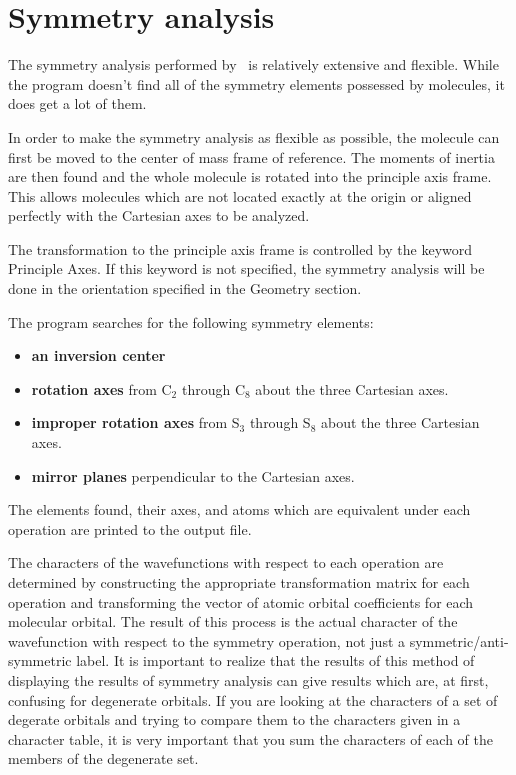 \chapter{Symmetry analysis}

The symmetry analysis performed by \calcprog\ is relatively extensive
and flexible.  While the program doesn't find all
of the symmetry elements possessed by molecules, it does get a lot of
them. 

In order to make the symmetry analysis as flexible as possible, the
molecule can first be moved to the center of mass frame of reference. 
The 
moments of inertia are then found and the whole molecule is rotated
into the principle axis frame.  This allows molecules which are not
located exactly at the origin or aligned perfectly with the Cartesian
axes to be analyzed.  

The transformation to the principle axis frame is controlled by the
keyword {\sf Principle Axes}.  If this keyword is not specified, the
symmetry analysis will be done in the orientation specified in the
{\sf Geometry} section.

The program searches for the following
symmetry elements:

\begin{itemize}

\item {\bf an inversion center}

\item {\bf rotation axes} from C$_2$ through C$_8$ about the three
Cartesian axes.

\item {\bf improper rotation axes} from S$_3$ through S$_8$ about the
three Cartesian axes.

\item {\bf mirror planes} perpendicular to the Cartesian axes.

\end{itemize}

The elements found, their axes, and atoms which are equivalent under
each operation are printed to the output file.

The characters of the wavefunctions with respect to each operation are
determined by constructing the appropriate transformation matrix for
each operation and transforming the vector of atomic orbital
coefficients for each molecular orbital.  The result of this process
is the actual character of the wavefunction with respect to the
symmetry operation, not just a symmetric/anti-symmetric label.
It is important to realize that the results of this method of
displaying the results of symmetry analysis can give results which
are, at first, confusing for degenerate orbitals.  If you are looking
at the characters of a set of degerate orbitals and trying to compare
them to the characters given in a character table, it is very
important that you sum the characters of each of the members of the
degenerate set.


